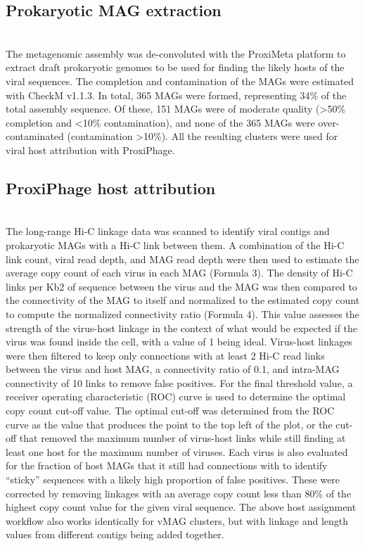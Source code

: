 \subsection*{Prokaryotic MAG extraction} \hfill\\
	The metagenomic assembly was de-convoluted with the ProxiMeta \cite{RN16} platform to extract draft prokaryotic genomes to be used for finding the likely hosts of the viral sequences. The completion and contamination of the MAGs were estimated with CheckM \cite{RN13} v1.1.3. In total, 365 MAGs were formed, representing 34\% of the total assembly sequence. Of these, 151 MAGs were of moderate quality (>50\% completion and <10\% contamination), and none of the 365 MAGs were over-contaminated (contamination >10\%). All the resulting clusters were used for viral host attribution with ProxiPhage.
	
\subsection*{ProxiPhage host attribution} \hfill\\
	The long-range Hi-C linkage data was scanned to identify viral contigs and prokaryotic MAGs with a Hi-C link between them. A combination of the Hi-C link count, viral read depth, and MAG read depth were then used to estimate the average copy count of each virus in each MAG (Formula 3). The density of Hi-C links per Kb2 of sequence between the virus and the MAG was then compared to the connectivity of the MAG to itself and normalized to the estimated copy count to compute the normalized connectivity ratio (Formula 4). This value assesses the strength of the virus-host linkage in the context of what would be expected if the virus was found inside the cell, with a value of 1 being ideal. Virus-host linkages were then filtered to keep only connections with at least 2 Hi-C read links between the virus and host MAG, a connectivity ratio of 0.1, and intra-MAG connectivity of 10 links to remove false positives. For the final threshold value, a receiver operating characteristic (ROC) curve is used to determine the optimal copy count cut-off value. The optimal cut-off was determined from the ROC curve as the value that produces the point to the top left of the plot, or the cut-off that removed the maximum number of virus-host links while still finding at least one host for the maximum number of viruses. Each virus is also evaluated for the fraction of host MAGs that it still had connections with to identify “sticky” sequences with a likely high proportion of false positives. These were corrected by removing linkages with an average copy count less than 80\% of the highest copy count value for the given viral sequence. The above host assignment workflow also works identically for vMAG clusters, but with linkage and length values from different contigs being added together.
	
